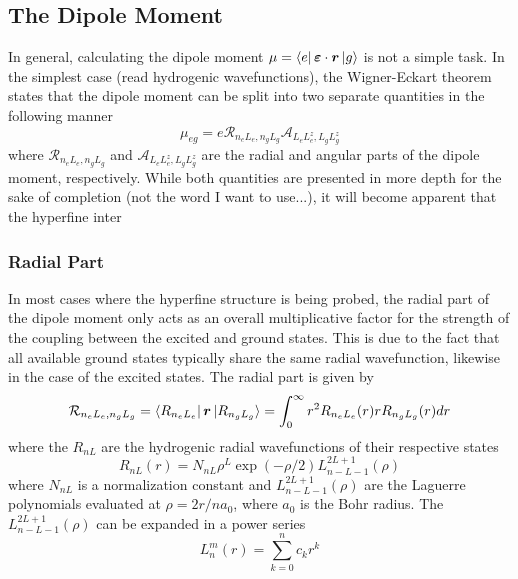 \subsection{The Dipole Moment}
In general, calculating the dipole moment  $\mu = \bra{e} \bm{\varepsilon} \cdot \bm{r} \ket{g}$ is not a simple task. 
In the simplest case (read hydrogenic wavefunctions), the Wigner-Eckart theorem states that the dipole moment can be split into two separate quantities in the following manner
\begin{equation}
\mu_{eg} = e \mathcal{R}_{n_e L_e, n_g L_g}\mathcal{A}_{L_eL_e^z, L_gL_g^z}
\label{muref}
\end{equation}
where $\mathcal{R}_{n_e L_e, n_g L_g}$ and $\mathcal{A}_{L_eL_e^z, L_gL_g^z}$ are the radial and angular parts of the dipole moment, respectively. While both quantities are presented in more depth for the sake of completion (not the word I want to use...), it will become apparent that the hyperfine inter

\subsubsection*{Radial Part}
In most cases where the hyperfine structure is being probed, the radial part of the dipole moment only acts as an overall multiplicative factor for the strength of the coupling between the excited and ground states. This is due to the fact that all available ground states typically share the same radial wavefunction, likewise in the case of the excited states. The radial part is given by
\begin{equation}
\mathcal{R}_{n_e L_e, n_g L_g} = \bra{R_{n_e L_e}}\bm{r}\ket{R_{n_g L_g}} = \int_0^{\infty}r^2R_{n_e L_e}(r)rR_{n_g L_g}(r)dr
\end{equation}
where the $R_{nL}$ are the hydrogenic radial wavefunctions of their respective states
\begin{equation}
R_{nL}(r) = N_{nL}\rho^L\exp(-\rho/2)L_{n-L-1}^{2L+1}(\rho)
\end{equation}
where $N_{nL}$ is a normalization constant and $L_{n-L-1}^{2L+1}(\rho)$ are the Laguerre polynomials evaluated at $\rho = 2r/na_0$, where $a_0$ is the Bohr radius. The $L_{n-L-1}^{2L+1}(\rho)$ can be expanded in a power series
\begin{equation}
L_{n}^{m}(r) = \sum_{k=0}^{n} c_kr^k
\end{equation}

